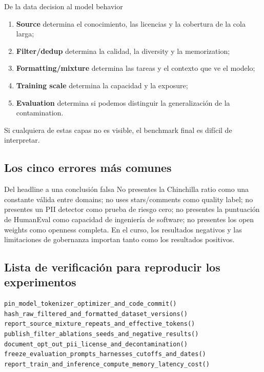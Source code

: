 \documentclass[a4paper]{article}
\begin{document}
\begin{importantbox}{De la data decision al model behavior}
\begin{enumerate}
  \item \textbf{Source} determina el conocimiento, las licencias y la cobertura de la cola larga;
  \item \textbf{Filter/dedup} determina la calidad, la diversity y la memorization;
  \item \textbf{Formatting/mixture} determina las tareas y el contexto que ve el modelo;
  \item \textbf{Training scale} determina la capacidad y la exposure;
  \item \textbf{Evaluation} determina si podemos distinguir la generalización de la contamination.
\end{enumerate}
Si cualquiera de estas capas no es visible, el benchmark final es difícil de interpretar.
\end{importantbox}

\subsection{Los cinco errores más comunes}

\begin{warningbox}{Del headline a una conclusión falsa}
No presentes la Chinchilla ratio como una constante válida entre domains; no uses stars/comments como quality label; no presentes un PII detector como prueba de riesgo cero; no presentes la puntuación de HumanEval como capacidad de ingeniería de software; no presentes los open weights como openness completa. En el curso, los resultados negativos y las limitaciones de gobernanza importan tanto como los resultados positivos.
\end{warningbox}

\subsection{Lista de verificación para reproducir los experimentos}

\begin{lstlisting}[caption={Lista unificada de reproducción para proyectos de preentrenamiento}]
pin_model_tokenizer_optimizer_and_code_commit()
hash_raw_filtered_and_formatted_dataset_versions()
report_source_mixture_repeats_and_effective_tokens()
publish_filter_ablations_seeds_and_negative_results()
document_opt_out_pii_license_and_decontamination()
freeze_evaluation_prompts_harnesses_cutoffs_and_dates()
report_train_and_inference_compute_memory_latency_cost()
\end{lstlisting}
\end{document}
